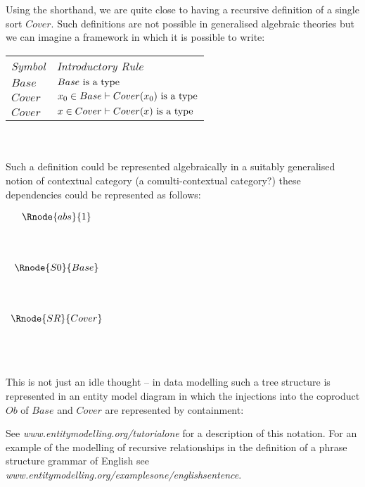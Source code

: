 Using the shorthand, we are quite close to having a recursive definition of a single sort $Cover$.
Such definitions are not possible in generalised algebraic theories but we can imagine a framework in which it is possible to write: \\
\vspace{0.03cm} 
\begin{tabular}{>{\itshape}l l}
Symbol & \itshape{Introductory Rule} \\
$Base $     & $Base\mbox{ is a type}$\\
$Cover  $     & $x_0 \in Base    \vdash Cover(x_0)\mbox{ is a type} $\\
$Cover $      & $x \in Cover    \vdash Cover(x)\mbox{ is a type} $\\
\end{tabular} \\
\vspace{.1cm}  \\

Such a definition could be represented algebraically in a suitably generalised notion of contextual category (a comulti-contextual category?) these dependencies could be represented
as follows:  

\begin{center}
$
\begin{array}{c c}
\Rnode{abs}{1}  \\ [1.4cm]
\Rnode{S0}{Base} \\ [1.4cm]
\Rnode{SR}{Cover} \\ [1.4cm]
\end{array}
$
\end{center}

\noindent This is not just an idle thought -- in  data modelling such a tree 
structure is represented in an entity model diagram in which the injections into the coproduct $Ob$ of $Base$ and $Cover$ are represented by containment: \\

\begin{center}

\end {center}
See \textit{www.entitymodelling.org/tutorialone} for a description of this notation.
For an example of the modelling of recursive relationships in the definition of a phrase structure grammar of English see 
\textit{www.entitymodelling.org/examplesone/englishsentence}.